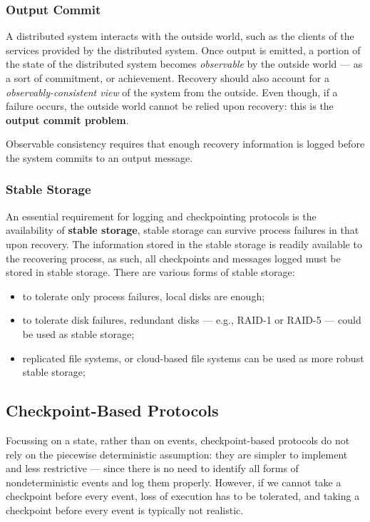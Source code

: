 \documentclass[11pt, a4paper]{article}
\begin{document}
\subsubsection{Output Commit}\label{sec:output_commit} %
A distributed system interacts with the outside world, such as the clients of the services provided by the distributed system.
Once output is emitted, a portion of the state of the distributed system becomes \textit{observable} by the outside world --- as a sort of commitment, or achievement.
Recovery should also account for a \textit{observably-consistent view} of the system from the outside.
Even though, if a failure occurs, the outside world cannot be relied upon recovery: this is the \textbf{output commit problem}.
\begin{warning}
   Observable consistency requires that enough recovery information is logged before the system commits to an output message. 
\end{warning}
\subsubsection{Stable Storage}\label{sec:stable_storage} %
An essential requirement for logging and checkpointing protocols is the availability of \textbf{stable storage}, stable storage can survive process failures in that upon recovery.
The information stored in the stable storage is readily available to the recovering process, as such, all checkpoints and messages logged must be stored in stable storage.
There are various forms of stable storage:
\begin{itemize}
    \item to tolerate only process failures, local disks are enough;
    \item to tolerate disk failures, redundant disks --- e.g., RAID-1 or RAID-5 --- could be used as stable storage;
    \item replicated file systems, or cloud-based file systems can be used as more robust stable storage;
\end{itemize}
%
\subsection{Checkpoint-Based Protocols}\label{sub:checkpoint_based_protocols} %
Focussing on a state, rather than on events, checkpoint-based protocols do not rely on the piecewise deterministic assumption: they are simpler to implement and less restrictive --- since there is no need to identify all forms of nondeterministic events and log them properly.
However, if we cannot take a checkpoint before every event, loss of execution has to be tolerated, and taking a checkpoint before every event is typically not realistic.
%
\end{document}
